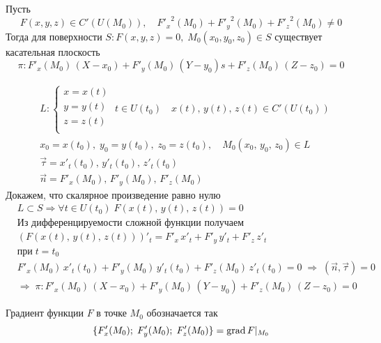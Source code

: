 		\begin{Th} Пусть
            \[
                F(x, y, z) \in C'(U(M_0)), \quad {F'_x}^2(M_0) + {F'_y}^2(M_0) + {F'_z}^2(M_0) \neq 0
            \]
			Тогда для поверхности $S : F(x, y, z) = 0, \; M_0(x_0, y_0, z_0) \in S$ существует касательная плоскость 
            \[
                \pi : F'_x(M_0)\,(X-x_0) + F'_y(M_0)\,(Y-y_0) s+ F'_z(M_0)\,(Z-z_0) = 0
            \]
		\end{Th}
		\begin{Proof}
			\begin{align*}
			&L:\begin{cases}
					x = x(t)\\
					y = y(t)\\
					z = z(t)\\	
			   \end{cases} \; t \in U(t_0) \quad x(t),\, y(t),\, z(t) \in C'(U(t_0))\\
			&x_0 = x(t_0), \; y_0 = y(t_0), \; z_0 = z(t_0), \quad M_0(x_0,\, y_0,\, z_0) \in L\\
			&\vec{\tau} = {x'_t(t_0),\, y'_t(t_0),\, z'_t(t_0)}\\
			&\vec{n} = {F'_x(M_0),\, F'_y(M_0),\, F'_z(M_0)}
			\end{align*}
            Докажем, что скалярное произведение равно нулю
            \begin{align*}
			&L \subset S \Rightarrow \forall t \in U(t_0) \; F(x(t),\, y(t),\, z(t)) = 0\\
			&\text{Из дифференцируемости сложной функции получаем}\\
			&(F(x(t),\, y(t),\, z(t)))'_t = F'_x\, x'_t + F'_y\, y'_t + F'_z\, z'_t\\ &\text{при} \; t = t_0\\
			&F'_x(M_0)\,x'_t(t_0) + F'_y(M_0)\,y'_t(t_0) + F'_z(M_0)\,z'_t(t_0) = 0 \; \Rightarrow \; (\vec{n}, \vec{\tau}) = 0\\
			&\Rightarrow \; \pi : F'_x(M_0)\,(X-x_0) + F'_y(M_0)\,(Y-y_0) + F'_z(M_0)\,(Z-z_0) = 0
			\end{align*}
		\end{Proof}
		
		\begin{Def}[Градиент] Градиент функции $F$ в точке $M_0$ обозначается так
        \[ 
            \{F'_x(M_0);\; F'_y(M_0);\; F'_z(M_0)\} = \mathop{\mathrm{grad}} F |_{M_0}
        \]  
		\end{Def}
	
